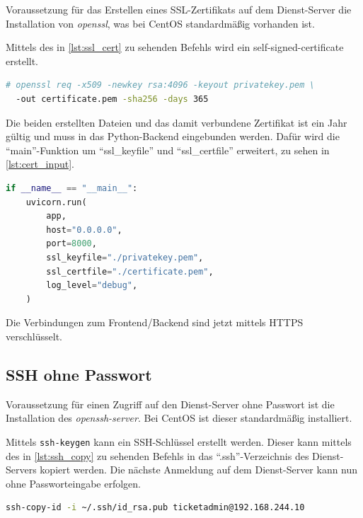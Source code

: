 \documentclass[a4paper,
    11pt,
    headings=small,
    ngerman,
    listof=totoc,
    numbers=noenddot]{scrreprt}[2021/11/13]
\begin{document}
Voraussetzung für das Erstellen eines SSL-Zertifikats auf dem Dienst-Server die Installation von  \textit{openssl}, was bei CentOS standardmäßig vorhanden ist.

Mittels des in \vref{lst:ssl_cert} zu sehenden Befehls wird ein self-signed-certificate erstellt.

\begin{lstlisting}[language=bash,caption={Erstellen eines self-signed-certificates},label={lst:ssl_cert}]
  # openssl req -x509 -newkey rsa:4096 -keyout privatekey.pem \
  -out certificate.pem -sha256 -days 365
\end{lstlisting}

Die beiden erstellten Dateien und das damit verbundene Zertifikat ist ein Jahr gültig und muss in das Python-Backend eingebunden werden. Dafür wird die \enquote{main}-Funktion um \enquote{ssl\_keyfile} und \enquote{ssl\_certfile} erweitert, zu sehen in \vref{lst:cert_input}.

\begin{lstlisting}[language=python,caption={Einbinden des self-signed-certificate},label={lst:cert_input}]
  if __name__ == "__main__":
    uvicorn.run(
        app,
        host="0.0.0.0",
        port=8000,
        ssl_keyfile="./privatekey.pem",
        ssl_certfile="./certificate.pem",
        log_level="debug",
    )
\end{lstlisting}

Die Verbindungen zum Frontend/Backend sind jetzt mittels HTTPS verschlüsselt.


\subsection{SSH ohne Passwort}

Voraussetzung für einen Zugriff auf den Dienst-Server ohne Passwort ist die Installation des \textit{openssh-server}. Bei CentOS ist dieser standardmäßig installiert.

Mittels \texttt{ssh-keygen} kann ein SSH-Schlüssel erstellt werden. Dieser kann mittels des in \vref{lst:ssh_copy} zu sehenden Befehls in das \enquote{.ssh}-Verzeichnis des Dienst-Servers kopiert werden. Die nächste Anmeldung auf dem Dienst-Server kann nun ohne Passworteingabe erfolgen.

\begin{lstlisting}[language=bash,caption={Kopieren des SSH-Keys auf den Dienste-Server},label={lst:ssh_copy}]
  ssh-copy-id -i ~/.ssh/id_rsa.pub ticketadmin@192.168.244.10
\end{lstlisting}
\end{document}
